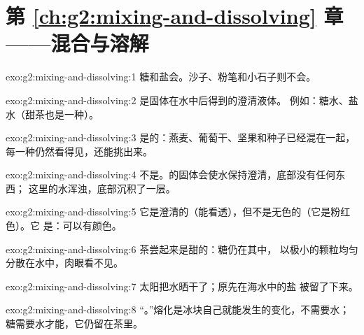 \section*{第 \ref{ch:g2:mixing-and-dissolving} 章——混合与溶解}

\begin{solution}{exo:g2:mixing-and-dissolving:1}
糖和盐会。沙子、粉笔和小石子则不会。
\end{solution}

\begin{solution}{exo:g2:mixing-and-dissolving:2}
是固体在水中后得到的澄清液体。
例如：糖水、盐水（甜茶也是一种）。
\end{solution}

\begin{solution}{exo:g2:mixing-and-dissolving:3}
是的：燕麦、葡萄干、坚果和种子已经混在一起，
每一种仍然看得见，还能挑出来。
\end{solution}

\begin{solution}{exo:g2:mixing-and-dissolving:4}
不是。的固体会使水保持澄清，底部没有任何东西；
这里的水浑浊，底部沉积了一层。
\end{solution}

\begin{solution}{exo:g2:mixing-and-dissolving:5}
它是澄清的（能看透），但不是无色的（它是粉红色）。它
是：可以有颜色。
\end{solution}

\begin{solution}{exo:g2:mixing-and-dissolving:6}
茶尝起来是甜的：糖仍在其中，
以极小的颗粒均匀分散在水中，肉眼看不见。
\end{solution}

\begin{solution}{exo:g2:mixing-and-dissolving:7}
太阳把水晒干了；原先在海水中的盐
被留了下来。
\end{solution}

\begin{solution}{exo:g2:mixing-and-dissolving:8}
“。”熔化是冰块自己就能发生的变化，不需要水；
糖需要水才能，它仍留在茶里。
\end{solution}

